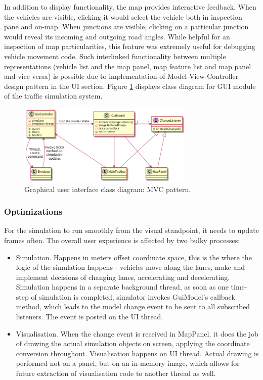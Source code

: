 In addition to display functionality, the map provides interactive feedback. When the vehicles are visible, clicking it would select the vehicle both in inspection pane and on-map. When junctions are visible, clicking on a particular junction would reveal its incoming and outgoing road angles. While helpful for an inspection of map particularities, this feature was extremely useful for debugging vehicle movement code. Such interlinked functionality between multiple representations (vehicle list and the map panel, map feature list and map panel and vice versa) is possible due to implementation of Model-View-Controller design pattern in the UI section. Figure \ref{fig:guiMVC} displays class diagram for GUI module of the traffic simulation system.

\begin{figure}[h]
    \vspace{1.5em}
    \caption{Graphical user interface class diagram: MVC pattern.}
    \label{fig:guiMVC}
    \centering
    \includegraphics[width=0.75\textwidth]{../../uml_diagrams/GUI.png}
\end{figure}

\subsubsection{Optimizations}
For the simulation to run smoothly from the visual standpoint, it needs to update frames often. The overall user experience is affected by two bulky processes:
\begin{itemize}
    \item Simulation. Happens in meters offset coordinate space, this is the where the logic of the simulation happens - vehicles move along the lanes, make and implement decisions of changing lanes, accelerating and decelerating. Simulation happens in a separate background thread, as soon as one time-step of simulation is completed, simulator invokes GuiModel's callback method, which leads to the model change event to be sent to all subscribed listeners. The event is posted on the UI thread.
    \item Visualisation. When the change event is received in MapPanel, it does the job of drawing the actual simulation objects on screen, applying the coordinate conversion throughout. Visualisation happens on UI thread. Actual drawing is performed not on a panel, but on an in-memory image, which allows for future extraction of visualisation code to another thread as well.
\end{itemize}


